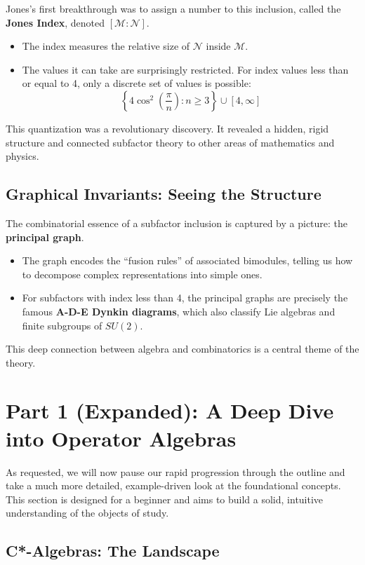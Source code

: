 \documentclass[11pt, a4paper]{article}
\theoremstyle{colored_def}
\theoremstyle{colored_thm}
\theoremstyle{colored_ex}
\newcommand{\M}{\mathcal{M}}
\newcommand{\N}{\mathcal{N}}
\begin{document}
Jones's first breakthrough was to assign a number to this inclusion, called the \textbf{Jones Index}, denoted $[\M : \N]$.

\begin{itemize}
    \item The index measures the relative size of $\mathcal{N}$ inside $\mathcal{M}$.
    \item The values it can take are surprisingly restricted. For index values less than or equal to 4, only a discrete set of values is possible:
    $$ \left\{ 4\cos^2\left(\frac{\pi}{n}\right) : n \geq 3 \right\} \cup [4, \infty] $$
\end{itemize}
This quantization was a revolutionary discovery. It revealed a hidden, rigid structure and connected subfactor theory to other areas of mathematics and physics.

\subsection{Graphical Invariants: Seeing the Structure}

The combinatorial essence of a subfactor inclusion is captured by a picture: the \textbf{principal graph}.

\begin{itemize}
    \item The graph encodes the ``fusion rules'' of associated bimodules, telling us how to decompose complex representations into simple ones.
    \item For subfactors with index less than 4, the principal graphs are precisely the famous \textbf{A-D-E Dynkin diagrams}, which also classify Lie algebras and finite subgroups of $SU(2)$.
\end{itemize}
This deep connection between algebra and combinatorics is a central theme of the theory.

\clearpage
\section{Part 1 (Expanded): A Deep Dive into Operator Algebras}\label{sec:part1}

As requested, we will now pause our rapid progression through the outline and take a much more detailed, example-driven look at the foundational concepts. This section is designed for a beginner and aims to build a solid, intuitive understanding of the objects of study.

\subsection{C*-Algebras: The Landscape}
\end{document}
